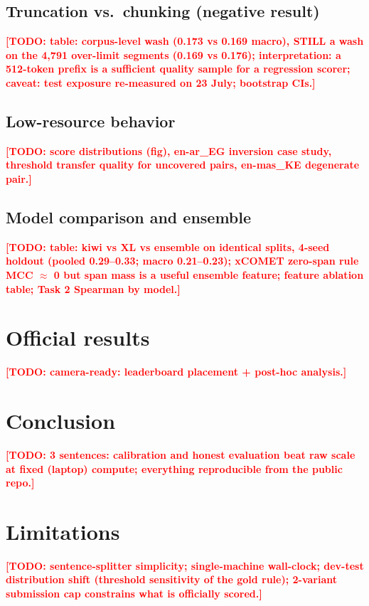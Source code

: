 \documentclass[11pt]{article}
\newcommand{\todo}[1]{\textbf{\textcolor{red}{[TODO: #1]}}}
\begin{document}
\subsection{Truncation vs.\ chunking (negative result)}
\todo{table: corpus-level wash (0.173 vs 0.169 macro), STILL a wash on the
4{,}791 over-limit segments (0.169 vs 0.176); interpretation: a 512-token
prefix is a sufficient quality sample for a regression scorer; caveat: test
exposure re-measured on 23 July; bootstrap CIs.}

\subsection{Low-resource behavior}
\todo{score distributions (fig), en-ar\_EG inversion case study, threshold
transfer quality for uncovered pairs, en-mas\_KE degenerate pair.}

\subsection{Model comparison and ensemble}
\todo{table: kiwi vs XL vs ensemble on identical splits, 4-seed holdout
(pooled 0.29--0.33; macro 0.21--0.23); xCOMET zero-span rule MCC $\approx$ 0
but span mass is a useful ensemble feature; feature ablation table; Task 2
Spearman by model.}

\section{Official results}
\todo{camera-ready: leaderboard placement + post-hoc analysis.}

\section{Conclusion}
\todo{3 sentences: calibration and honest evaluation beat raw scale at fixed
(laptop) compute; everything reproducible from the public repo.}

\section*{Limitations}
\todo{sentence-splitter simplicity; single-machine wall-clock; dev-test
distribution shift (threshold sensitivity of the gold rule); 2-variant
submission cap constrains what is officially scored.}


\end{document}
